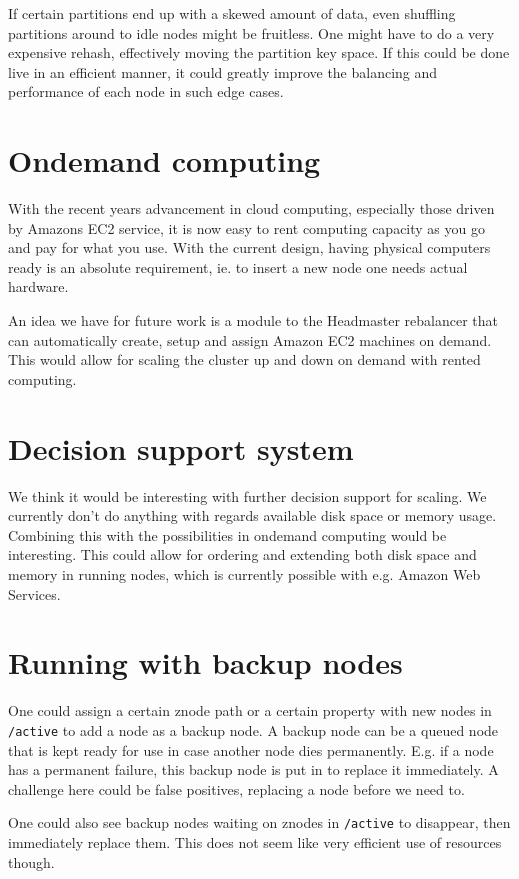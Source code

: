If certain partitions end up with a skewed amount of data, even shuffling partitions around to idle nodes might be fruitless. One might have to do a very expensive rehash, effectively moving the partition key space. If this could be done live in an efficient manner, it could greatly improve the balancing and performance of each node in such edge cases.

\section{Ondemand computing}
With the recent years advancement in cloud computing, especially those driven by Amazons EC2 service, it is now easy to rent computing capacity as you go and pay for what you use.
With the current design, having physical computers ready is an absolute requirement, ie. to insert a new node one needs actual hardware.

An idea we have for future work is a module to the Headmaster rebalancer that can automatically create, setup and assign Amazon EC2 machines on demand. This would allow for scaling the cluster up and down on demand with rented computing.

\section{Decision support system}
We think it would be interesting with further decision support for scaling. We currently don't do anything with regards available disk space or memory usage. 
Combining this with the possibilities in ondemand computing would be interesting.
This could allow for ordering and extending both disk space and memory in running nodes, which is currently possible with e.g. Amazon Web Services.

\section{Running with backup nodes}
One could assign a certain znode path or a certain property with new nodes in \texttt{/active} to add a node as a backup node.
A backup node can be a queued node that is kept ready for use in case another node dies permanently. E.g. if a node has a permanent failure, this backup node is put in to replace it immediately. A challenge here could be false positives, replacing a node before we need to.

One could also see backup nodes waiting on znodes in \texttt{/active} to disappear, then immediately replace them. This does not seem like very efficient use of resources though.

